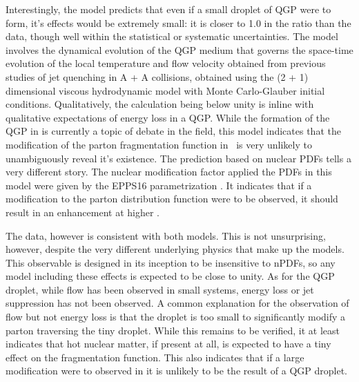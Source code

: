 Interestingly, the model predicts that even if a small droplet of QGP were to form, it's effects would be extremely small: it is closer to 1.0 in the ratio than the data, though well within the statistical or systematic uncertainties. The model involves the dynamical evolution of the QGP medium that governs the space-time evolution of the local temperature and flow velocity obtained from previous studies of jet quenching in A + A collisions, obtained using the (2 + 1) dimensional viscous hydrodynamic model with Monte Carlo-Glauber initial conditions. Qualitatively, the calculation being below unity is inline with qualitative expectations of energy loss in a QGP. While the formation of the QGP in \pPb is currently a topic of debate in the field, this model indicates that the modification of the parton fragmentation function in \pPb~is very unlikely to unambiguously reveal it's existence. The prediction based on nuclear PDFs tells a very different story. The nuclear modification factor applied the PDFs in this model were given by the EPPS16 parametrization \cite{Eskola2017a}. It indicates that if a modification to the parton distribution function were to be observed, it should result in an enhancement at higher \zt. 

The data, however is consistent with both models. This is not unsurprising, however, despite the very different underlying physics that make up the models. This observable is designed in its inception to be insensitive to nPDFs, so any model including these effects is expected to be close to unity. As for the QGP droplet, while flow has been observed in small systems, energy loss or jet suppression has not been observed. A common explanation for the observation of flow but not energy loss is that the droplet is too small to significantly modify a parton traversing the tiny droplet. While this remains to be verified, it at least indicates that hot nuclear matter, if present at all, is expected to have a tiny effect on the fragmentation function. This also indicates that if a large modification were to observed in \pPb it is unlikely to be the result of a QGP droplet.

